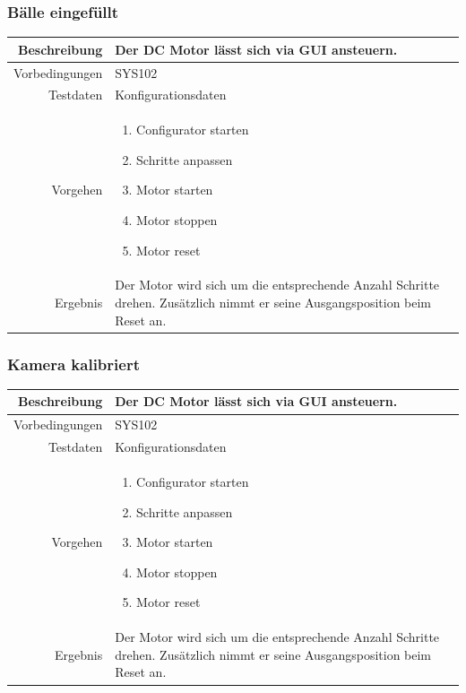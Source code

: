 \subsubsection{Bälle eingefüllt}
\begin{table}[h!]
	\renewcommand{\arraystretch}{1.5}
	\begin{tabular}{|r|p{14cm}|}
		\hline Beschreibung & Der DC Motor lässt sich via GUI ansteuern. \\ 
		\hline Vorbedingungen & SYS102 \\ 
		\hline Testdaten & Konfigurationsdaten \\ 
		\hline Vorgehen & 
		\begin{enumerate}
			\item Configurator starten
			\item Schritte anpassen
			\item Motor starten
			\item Motor stoppen
			\item Motor reset
		\end{enumerate} \\ 
		\hline Ergebnis & Der Motor wird sich um die entsprechende Anzahl Schritte drehen. Zusätzlich nimmt er seine Ausgangsposition beim Reset an. \\ 
		\hline 
	\end{tabular}
\end{table}

\subsubsection{Kamera kalibriert}
\begin{table}[h!]
	\renewcommand{\arraystretch}{1.5}
	\begin{tabular}{|r|p{14cm}|}
		\hline Beschreibung & Der DC Motor lässt sich via GUI ansteuern. \\ 
		\hline Vorbedingungen & SYS102 \\ 
		\hline Testdaten & Konfigurationsdaten \\ 
		\hline Vorgehen & 
		\begin{enumerate}
			\item Configurator starten
			\item Schritte anpassen
			\item Motor starten
			\item Motor stoppen
			\item Motor reset
		\end{enumerate} \\ 
		\hline Ergebnis & Der Motor wird sich um die entsprechende Anzahl Schritte drehen. Zusätzlich nimmt er seine Ausgangsposition beim Reset an. \\ 
		\hline 
	\end{tabular}
\end{table}

